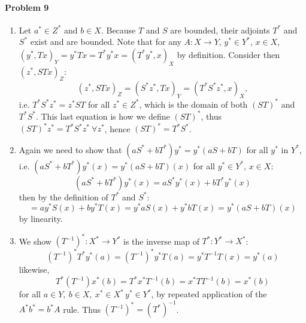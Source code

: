 \documentclass[12pt]{article}
\begin{document}
\paragraph{Problem 9}
\begin{enumerate}[label=(\alph*)]
\item 
  Let $a^*\in Z^*$ and $b\in X$. Because $T$ and $S$ are bounded, their adjoints
  $T^*$ and $S^*$ exist and are bounded. Note that for any $A: X\to Y$, $y^*\in
  Y^*$, $x\in X$, $(y^*, Tx)_Y = y^*Tx = T^*y^*x = (T^*y^*,x)_X$ by definition.
  Consider then $(z^*,STx)_Z$:
  \begin{displaymath}
    (z^*,STx)_Z = (S^*z^*,Tx)_Y = (T^*S^*z^*,x)_X,
  \end{displaymath}
  i.e. $T^*S^*z^* = z^*ST$ for all $z^* \in Z^*$, which is the domain of both
  $(ST)^*$ and $T^*S^*$. This last equation is how we define $(ST)^*$, thus $(ST)^*
  z^* = T^*S^*z^*\ \forall z^*$, hence $(ST)^* = T^*S^*$.
\item Again we need to show that $(aS^* + bT^*)y^* = y^*(aS+bT)$ for all $y^*
  $ in $Y^*$, i.e. $(aS^*+bT^*)y^*(x) = y^*(aS+bT)(x)$ for all $y^*\in Y^*$,
  $x\in X$:
  \begin{displaymath}
    (aS^*+bT^*)y^*(x) = aS^*y^*(x)+bT^*y^*(x)
  \end{displaymath}
  then by the definition of $T^*$ and $S^*$:
  \begin{displaymath}
    = ay^*S(x)+by^*T(x) = y^*aS(x)+y^*bT(x) = y^*(aS + bT)(x)
  \end{displaymath}
  by linearity.
\item We show $(T^{-1})^*: X^*\to Y^*$ is the inverse map of $T^*:Y^*\to X^*$:
  \begin{displaymath}
    (T^{-1})^*T^*y^*(a) = (T^{-1})^*y^*T(a) = y^*T^{-1}T(x) = y^*(a)
  \end{displaymath}
  likewise,
  \begin{displaymath}
    T^*(T^{-1})x^*(b) = T^*x^*T^{-1}(b) = x^*TT^{-1}(b) = x^*(b)
  \end{displaymath}
  for all $a\in Y,\ b\in X,\ x^*\in X^*\, y^*\in Y^*$, by repeated application
  of the $A^*b^* = b^*A$ rule. Thus $(T^{-1})^* = (T^*)^{-1}$.

\end{enumerate}
\end{document}
